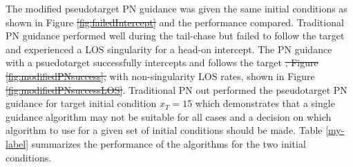 \documentclass[conference]{IEEEtran}
\providecommand{\DIFadd}[1]{{\protect\color{blue}\uwave{#1}}} %
\providecommand{\DIFdel}[1]{{\protect\color{red}\sout{#1}}}                      %
\providecommand{\DIFaddbegin}{} %
\providecommand{\DIFaddend}{} %
\providecommand{\DIFdelbegin}{} %
\providecommand{\DIFdelend}{} %
\providecommand{\DIFaddFL}[1]{\DIFadd{#1}} %
\providecommand{\DIFdelFL}[1]{\DIFdel{#1}} %
\providecommand{\DIFaddbeginFL}{} %
\providecommand{\DIFaddendFL}{} %
\providecommand{\DIFdelbeginFL}{} %
\providecommand{\DIFdelendFL}{} %
\newcommand{\DIFscaledelfig}{0.5}
\newlength{\DIFdelgraphicswidth} %
\newlength{\DIFdelgraphicsheight} %
\newcommand{\DIFaddincludegraphics}[2][]{{\color{blue}\fbox{\DIFOincludegraphics[#1]{#2}}}} %
\newcommand{\DIFdelincludegraphics}[2][]{%
\sbox{\DIFdelgraphicsbox}{\DIFOincludegraphics[#1]{#2}}%
\settoboxwidth{\DIFdelgraphicswidth}{\DIFdelgraphicsbox} %
\settoboxtotalheight{\DIFdelgraphicsheight}{\DIFdelgraphicsbox} %
\scalebox{\DIFscaledelfig}{%
\parbox[b]{\DIFdelgraphicswidth}{\usebox{\DIFdelgraphicsbox}\\[-\baselineskip] \rule{\DIFdelgraphicswidth}{0em}}\llap{\resizebox{\DIFdelgraphicswidth}{\DIFdelgraphicsheight}{%
\setlength{\unitlength}{\DIFdelgraphicswidth}%
\begin{picture}(1,1)%
\thicklines\linethickness{2pt} %
{\color[rgb]{1,0,0}\put(0,0){\framebox(1,1){}}}%
{\color[rgb]{1,0,0}\put(0,0){\line( 1,1){1}}}%
{\color[rgb]{1,0,0}\put(0,1){\line(1,-1){1}}}%
\end{picture}%
}\hspace*{3pt}}} %
} %
\DeclareRobustCommand{\DIFaddbegin}{\DIFOaddbegin \let\includegraphics\DIFaddincludegraphics} %
\DeclareRobustCommand{\DIFaddend}{\DIFOaddend \let\includegraphics\DIFOincludegraphics} %
\DeclareRobustCommand{\DIFdelbegin}{\DIFOdelbegin \let\includegraphics\DIFdelincludegraphics} %
\DeclareRobustCommand{\DIFdelend}{\DIFOaddend \let\includegraphics\DIFOincludegraphics} %
\DeclareRobustCommand{\DIFaddbeginFL}{\DIFOaddbeginFL \let\includegraphics\DIFaddincludegraphics} %
\DeclareRobustCommand{\DIFaddendFL}{\DIFOaddendFL \let\includegraphics\DIFOincludegraphics} %
\DeclareRobustCommand{\DIFdelbeginFL}{\DIFOdelbeginFL \let\includegraphics\DIFdelincludegraphics} %
\DeclareRobustCommand{\DIFdelendFL}{\DIFOaddendFL \let\includegraphics\DIFOincludegraphics} %
\begin{document}
\DIFdelend The modified pseudotarget PN guidance was given the same initial conditions as shown in Figure \DIFdelbegin \DIFdel{\ref{fig:failedIntercept} }\DIFdelend \DIFaddbegin \DIFadd{\ref{fig:comp} }\DIFaddend and the performance compared. Traditional PN guidance performed well during the tail-chase but failed to follow the target and experienced a LOS singularity for a head-on intercept. The PN guidance with a psuedotarget successfully intercepts and follows the target \DIFdelbegin \DIFdel{, Figure \ref{fig:modifiedPNsuccess}, }\DIFdelend with non-singularity LOS rates, shown in Figure \DIFdelbegin \DIFdel{\ref{fig:modifiedPNsuccessLOS}}\DIFdelend \DIFaddbegin \DIFadd{\ref{fig:compwithpt}}\DIFaddend . Traditional PN out performed the pseudotarget PN guidance for target initial condition $x_{T} = 15$ which demonstrates that a single guidance algorithm may not be suitable for all cases and a decision on which algorithm to use for a given set of initial conditions should be made. Table \ref{my-label} summarizes the performance of the algorithms for the two initial conditions.

%
\end{document}
